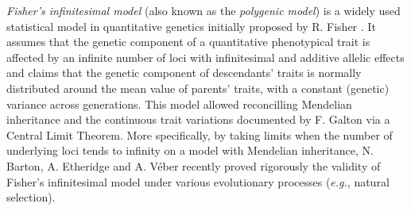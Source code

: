\documentclass[reqno]{amsart}
\numberwithin{equation}{section}
\begin{document}
{\textit{Fisher's infinitesimal model} (also known as the \textit{polygenic model}) is a widely used statistical model in quantitative genetics initially proposed by {\sc R. Fisher} \cite{F-18}. It assumes that the genetic component of a quantitative phenotypical trait is affected by an infinite number of loci with infinitesimal and additive allelic effects and claims that the genetic component of descendants' traits is normally distributed around the mean value of parents' traits, with a constant (genetic) variance across generations. This model allowed reconcilling Mendelian inheritance and the continuous trait variations documented by {\sc F. Galton} via a Central Limit Theorem. More specifically, by taking limits when the number of underlying loci tends to infinity on a model with Mendelian inheritance, {\sc N. Barton}, {\sc A. Etheridge} and {\sc A. V\'eber} \cite{BEV-17} recently proved rigorously the validity of Fisher's infinitesimal model under various evolutionary processes ({\em e.g.}, natural selection). 

}
\end{document}

